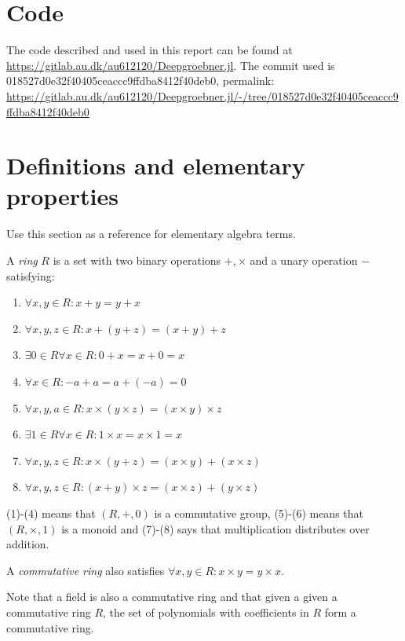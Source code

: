 \documentclass{article}
\theoremstyle{changedot}
\theoremstyle{changedotbreak}
\theoremstyle{nonumberplain}
\begin{document}
\printbibliography

\appendix
\section{Code}
The code described and used in this report can be found at \url{https://gitlab.au.dk/au612120/Deepgroebner.jl}. The commit used is \\ 018527d0e32f40405ceaccc9ffdba8412f40deb0, permalink: \url{https://gitlab.au.dk/au612120/Deepgroebner.jl/-/tree/018527d0e32f40405ceaccc9ffdba8412f40deb0}

\section{Definitions and elementary properties}
Use this section as a reference for elementary algebra terms.

\begin{definition}
  A \emph{ring} $R$ is a set with two binary operations $+, \times$ and a unary operation $-$ satisfying:
  
  \begin{enumerate}
    \item $\forall x, y \in R: x + y = y + x$
    \item $\forall x, y, z \in R: x + (y + z) = (x + y) + z$
    \item $\exists 0 \in R \forall x \in R : 0 + x = x + 0 = x$
    \item $\forall x \in R: -a + a = a + (-a) = 0$
    \item $\forall x, y, a \in R: x \times (y \times z) = (x \times y) \times z$
    \item $\exists 1 \in R \forall x \in R : 1 \times x = x \times 1 = x$
    \item $\forall x, y, z \in R: x \times (y + z) = (x \times y) + (x \times z)$
    \item $\forall x, y, z \in R: (x + y) \times z = (x \times z) + (y \times z)$
  \end{enumerate}

  (1)-(4) means that $(R, +, 0)$ is a commutative group, (5)-(6) means that $(R, \times, 1)$ is a monoid and (7)-(8) says that multiplication distributes over addition.

  A \emph{commutative ring} also satisfies $\forall x, y \in R: x \times y = y \times x$.
\end{definition}

Note that a field is also a commutative ring and that given a given a commutative ring $R$, the set of polynomials with coefficients in $R$ form a commutative ring.
\end{document}

